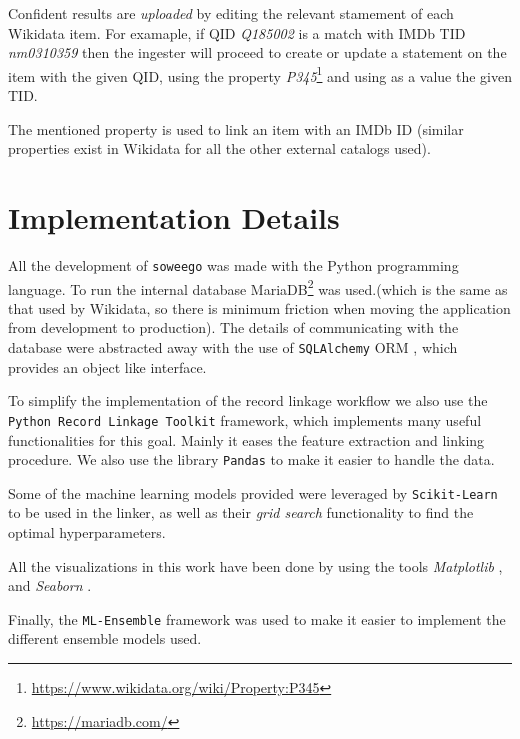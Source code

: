 \documentclass[epsfig,a4paper,11pt,titlepage,twoside,openany]{book}
\newcommand{\footurl}[1]{\footnote{\url{#1}}}
\begin{document}
Confident results are \textit{uploaded} by editing the relevant stamement of each Wikidata item. For examaple, if QID \textit{Q185002} is a match with IMDb TID \textit{nm0310359} then the ingester will proceed to create or update a statement on the item with the given QID, using the property \textit{P345}\footurl{https://www.wikidata.org/wiki/Property:P345} and using as a value the given TID. 



The mentioned property is used to link an item with an IMDb ID (similar properties exist in Wikidata for all the other external catalogs used).


\section{Implementation Details}
\label{sec:soweego-implementation-details}

All the development of \texttt{soweego} was made with the Python \cite{python-tutorial} programming language. To run the internal database  MariaDB\footurl{https://mariadb.com/} was used.(which is the same as that used by Wikidata, so there is minimum friction when moving the application from development to production). 
The details of communicating with the database were abstracted away with the use of \texttt{SQLAlchemy} ORM \cite{sqlalchemy}, which provides an object like interface.

To simplify the implementation of the record linkage workflow we also use the \texttt{Python Record Linkage Toolkit} \cite{recordlinkage-library} framework, which implements many useful functionalities for this goal. Mainly it eases the feature extraction and linking procedure. We also use the library \texttt{Pandas} \cite{mckinney-proc-scipy-2010} to make it easier to handle the data.

Some of the machine learning models provided were leveraged by \texttt{Scikit-Learn} \cite{scikit-learn} to be used in the linker, as well as their \textit{grid search} functionality to find the optimal hyperparameters.

All the visualizations in this work have been done by using the tools \textit{Matplotlib} \cite{Hunter_Matplotlib}, and \textit{Seaborn} \cite{Seaborn}.%

Finally, the \texttt{ML-Ensemble} \cite{flennerhag:2017mlens} framework was used to make it easier to implement the different ensemble models used.
\end{document}
